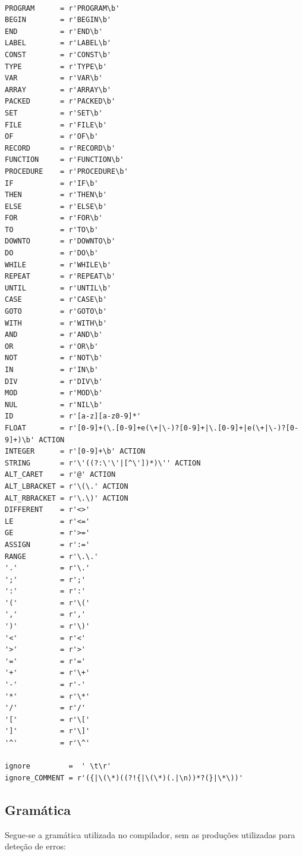\documentclass[12pt, a4paper]{article}
\begin{document}
\begin{lstlisting}

PROGRAM      = r'PROGRAM\b'
BEGIN        = r'BEGIN\b'
END          = r'END\b'
LABEL        = r'LABEL\b'
CONST        = r'CONST\b'
TYPE         = r'TYPE\b'
VAR          = r'VAR\b'
ARRAY        = r'ARRAY\b'
PACKED       = r'PACKED\b'
SET          = r'SET\b'
FILE         = r'FILE\b'
OF           = r'OF\b'
RECORD       = r'RECORD\b'
FUNCTION     = r'FUNCTION\b'
PROCEDURE    = r'PROCEDURE\b'
IF           = r'IF\b'
THEN         = r'THEN\b'
ELSE         = r'ELSE\b'
FOR          = r'FOR\b'
TO           = r'TO\b'
DOWNTO       = r'DOWNTO\b'
DO           = r'DO\b'
WHILE        = r'WHILE\b'
REPEAT       = r'REPEAT\b'
UNTIL        = r'UNTIL\b'
CASE         = r'CASE\b'
GOTO         = r'GOTO\b'
WITH         = r'WITH\b'
AND          = r'AND\b'
OR           = r'OR\b'
NOT          = r'NOT\b'
IN           = r'IN\b'
DIV          = r'DIV\b'
MOD          = r'MOD\b'
NUL          = r'NIL\b'
ID           = r'[a-z][a-z0-9]*'
FLOAT        = r'[0-9]+(\.[0-9]+e(\+|\-)?[0-9]+|\.[0-9]+|e(\+|\-)?[0-9]+)\b' ACTION
INTEGER      = r'[0-9]+\b' ACTION
STRING       = r'\'((?:\'\'|[^\'])*)\'' ACTION
ALT_CARET    = r'@' ACTION
ALT_LBRACKET = r'\(\.' ACTION
ALT_RBRACKET = r'\.\)' ACTION
DIFFERENT    = r'<>'
LE           = r'<='
GE           = r'>='
ASSIGN       = r':='
RANGE        = r'\.\.'
'.'          = r'\.'
';'          = r';'
':'          = r':'
'('          = r'\('
','          = r','
')'          = r'\)'
'<'          = r'<'
'>'          = r'>'
'='          = r'='
'+'          = r'\+'
'-'          = r'-'
'*'          = r'\*'
'/'          = r'/'
'['          = r'\['
']'          = r'\]'
'^'          = r'\^'

ignore         =  ' \t\r'
ignore_COMMENT = r'({|\(\*)((?!{|\(\*)(.|\n))*?(}|\*\))'
\end{lstlisting}

\subsection{Gramática}
\label{grammar-definition}

Segue-se a gramática utilizada no compilador, sem as produções utilizadas para deteção de erros:

\end{document}
